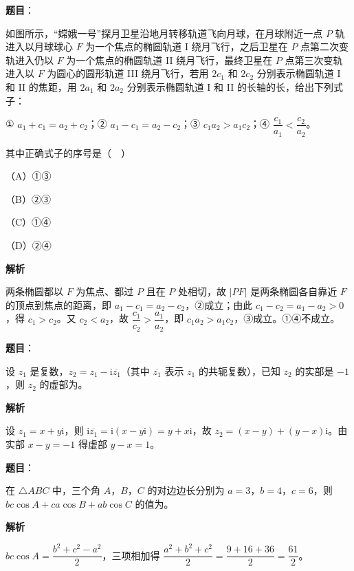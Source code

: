 \begin{answer}

\textbf{题目}：

如图所示，“嫦娥一号”探月卫星沿地月转移轨道飞向月球，在月球附近一点 $P$ 轨进入以月球球心 $F$ 为一个焦点的椭圆轨道 I 绕月飞行，之后卫星在 $P$ 点第二次变轨进入仍以 $F$ 为一个焦点的椭圆轨道 II 绕月飞行，最终卫星在 $P$ 点第三次变轨进入以 $F$ 为圆心的圆形轨道 III 绕月飞行，若用 $2c_1$ 和 $2c_2$ 分别表示椭圆轨道 I 和 II 的焦距，用 $2a_1$ 和 $2a_2$ 分别表示椭圆轨道 I 和 II 的长轴的长，给出下列式子：

① $a_1+c_1=a_2+c_2$；② $a_1-c_1=a_2-c_2$；③ $c_1a_2>a_1c_2$；④ $\dfrac{c_1}{a_1}<\dfrac{c_2}{a_2}$。

其中正确式子的序号是（　）

（A）①③

（B）②③

（C）①④

（D）②④
\nopagebreak[4]
\begin{center}\end{center}
\nopagebreak[4]
\textbf{解析}

两条椭圆都以 $F$ 为焦点、都过 $P$ 且在 $P$ 处相切，故 $|PF|$ 是两条椭圆各自靠近 $F$ 的顶点到焦点的距离，即 $a_1-c_1=a_2-c_2$，②成立；由此 $c_1-c_2=a_1-a_2>0$，得 $c_1>c_2$。又 $c_2<a_2$，故 $\dfrac{c_1}{c_2}>\dfrac{a_1}{a_2}$，即 $c_1a_2>a_1c_2$，③成立。①④不成立。


\end{answer}
\begin{answer}

\textbf{题目}：

设 $z_1$ 是复数，$z_2=z_1-\mathrm i\overline{z_1}$（其中 $\overline{z_1}$ 表示 $z_1$ 的共轭复数），已知 $z_2$ 的实部是 $-1$，则 $z_2$ 的虚部为\gkblank{}。

\textbf{解析}

设 $z_1=x+y\mathrm i$，则 $\mathrm i\overline{z_1}=\mathrm i(x-y\mathrm i)=y+x\mathrm i$，故 $z_2=(x-y)+(y-x)\mathrm i$。由实部 $x-y=-1$ 得虚部 $y-x=1$。


\end{answer}
\begin{answer}

\textbf{题目}：

在 $\triangle ABC$ 中，三个角 $A$，$B$，$C$ 的对边边长分别为 $a=3$，$b=4$，$c=6$，则 $bc\cos A+ca\cos B+ab\cos C$ 的值为\gkblank{}。

\textbf{解析}

$bc\cos A=\dfrac{b^2+c^2-a^2}2$，三项相加得 $\dfrac{a^2+b^2+c^2}2=\dfrac{9+16+36}2=\dfrac{61}2$。


\end{answer}
